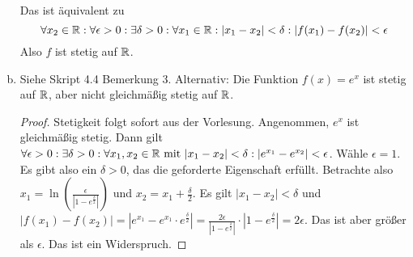 \documentclass{article}
\begin{document}
\begin{enumerate}[(a)]
        Das ist äquivalent zu $$\forall x_2 \in \mathbb{R}: \forall \epsilon > 0: \exists \delta > 0: \forall x_1 \in \mathbb{R}: |x_1 - x_2| < \delta: | f(x_1) - f(x_2)| < \epsilon$$
        Also $f$ ist stetig auf $\mathbb{R}$.
        \item Siehe Skript 4.4 Bemerkung 3. Alternativ:
        Die Funktion $f(x) = e^x$ ist stetig auf $\mathbb{R}$, aber nicht gleichmäßig stetig auf $\mathbb{R}$.
        \begin{proof}
            Stetigkeit folgt sofort aus der Vorlesung. Angenommen, $e^x$ ist gleichmäßig stetig. Dann gilt $\forall \epsilon > 0: \exists \delta >0: \forall x_1, x_2 \in \mathbb{R} \text{ mit }|x_1-x_2| < \delta: |e^{x_1} - e^{x_2}| < \epsilon$. Wähle $\epsilon = 1$. Es gibt also ein $\delta > 0$, das die geforderte Eigenschaft erfüllt. Betrachte also $x_1 = \ln(\frac{\epsilon}{| 1 - e^{\frac{\delta}{2}}|})$ und $x_2 = x_1 + \frac{\delta}{2}$. Es gilt $|x_1-x_2| < \delta$ und $|f(x_1) - f(x_2)| = | e^{x_1} - e^{x_1} \cdot e^{\frac{\delta}{2}} | = \frac{2\epsilon}{| 1 - e^{\frac{\delta}{2}}|} \cdot | 1 - e^{\frac{\delta}{2}}| = 2\epsilon$. Das ist aber größer als $\epsilon$. Das ist ein Widerspruch.
        \end{proof}
        
    \end{enumerate}
\end{document}
